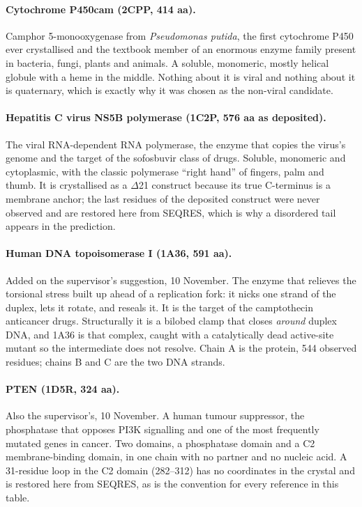 \documentclass[11pt,a4paper]{article}
\begin{document}
\paragraph{Cytochrome P450cam (2CPP, 414 aa).} Camphor 5-monooxygenase from
\emph{Pseudomonas putida}, the first cytochrome P450 ever crystallised and the
textbook member of an enormous enzyme family present in bacteria, fungi, plants
and animals. A soluble, monomeric, mostly helical globule with a heme in the
middle. Nothing about it is viral and nothing about it is quaternary, which is
exactly why it was chosen as the non-viral candidate.

\paragraph{Hepatitis C virus NS5B polymerase (1C2P, 576 aa as deposited).} The
viral RNA-dependent RNA polymerase, the enzyme that copies the virus's genome and
the target of the sofosbuvir class of drugs. Soluble, monomeric and cytoplasmic,
with the classic polymerase ``right hand'' of fingers, palm and thumb. It is
crystallised as a $\Delta$21 construct because its true C-terminus is a
membrane anchor; the last residues of the deposited construct were never
observed and are restored here from SEQRES, which is why a disordered tail
appears in the prediction.

\paragraph{Human DNA topoisomerase I (1A36, 591 aa).} Added on the
supervisor's suggestion, 10 November. The enzyme that relieves the torsional
stress built up ahead of a replication fork: it nicks one strand of the duplex,
lets it rotate, and reseals it. It is the target of the camptothecin anticancer
drugs. Structurally it is a bilobed clamp that closes \emph{around} duplex DNA,
and 1A36 is that complex, caught with a catalytically dead active-site mutant so
the intermediate does not resolve. Chain A is the protein, 544 observed
residues; chains B and C are the two DNA strands.

\paragraph{PTEN (1D5R, 324 aa).} Also the supervisor's, 10 November. A human
tumour suppressor, the phosphatase that opposes PI3K signalling and one of the
most frequently mutated genes in cancer. Two domains, a phosphatase domain and a
C2 membrane-binding domain, in one chain with no partner and no nucleic acid.
A 31-residue loop in the C2 domain (282--312) has no coordinates in the crystal
and is restored here from SEQRES, as is the convention for every reference in
this table.
\end{document}
